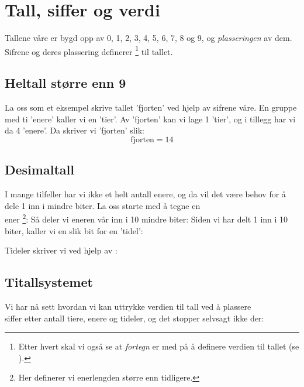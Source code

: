 \section{Tall, siffer og verdi \label{tallsiff}}
Tallene våre er bygd opp av  
0, 1, 2, 3, 4, 5, 6, 7, 8 og 9, og \textsl{plasseringen} av dem. Sifrene og deres plassering definerer
\footnote{Etter hvert skal vi også se at \textit{fortegn} er med på å definere verdien til tallet (se ).}
{}  til tallet.
\subsection*{Heltall større enn 9}
La oss som et eksempel skrive tallet 'fjorten' ved hjelp av sifrene våre.
En gruppe med ti 'enere' kaller vi en 'tier'. Av 'fjorten' kan vi lage 1 'tier', og i tillegg har vi da 4 'enere'. Da skriver vi 'fjorten' slik:
\[ \text{fjorten}=14 \]
{} 
\vsk
\newpage
\subsection*{Desimaltall}
I mange tilfeller har vi ikke et helt antall enere, og da vil det være behov for å dele 1 inn i mindre biter. La oss starte med å tegne en\\ ener\!\!
\footnote{Her definerer vi enerlengden større enn tidligere.}:
{} 
Så deler vi eneren vår inn i 10 mindre biter:
 \vs
{}
Siden vi har delt 1 inn i 10 biter, kaller vi en slik bit for en 'tidel':

Tideler skriver vi ved hjelp av   \sym{,}  :
\regv
{}

\newpage
\subsection*{Titallsystemet}
Vi har nå sett hvordan vi kan uttrykke verdien til tall ved å plassere \\siffer etter antall tiere, enere og tideler, og det stopper selvsagt ikke der: \regv

